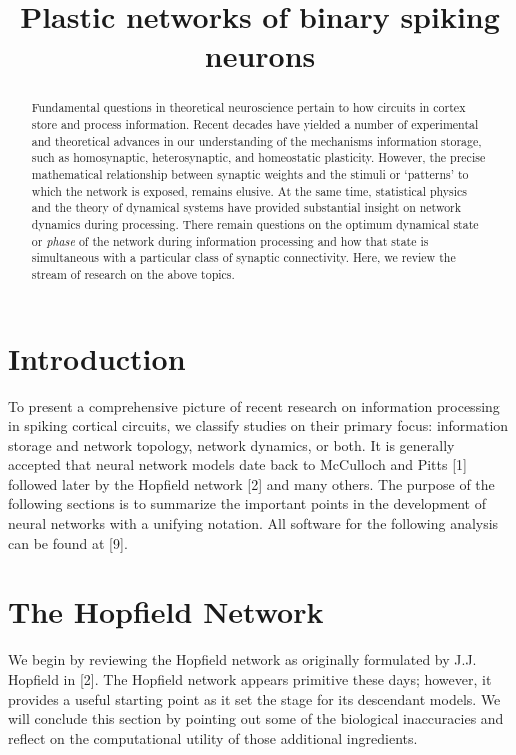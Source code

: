 \documentclass{article} %
\title{Plastic networks of binary spiking neurons}
\begin{document}
\maketitle

\begin{abstract}

Fundamental questions in theoretical neuroscience pertain to how circuits in cortex store and process information. Recent decades have yielded a number of experimental and theoretical advances in our understanding of the mechanisms information storage, such as homosynaptic, heterosynaptic, and homeostatic plasticity. However, the precise mathematical relationship between synaptic weights and the stimuli or `patterns' to which the network is exposed, remains elusive. At the same time, statistical physics and the theory of dynamical systems have provided substantial insight on network dynamics during processing. There remain questions on the optimum dynamical state or \emph{phase} of the network during information processing and how that state is simultaneous with a particular class of synaptic connectivity. Here, we review the stream of research on the above topics.


\end{abstract}


\section{Introduction}

To present a comprehensive picture of recent research on information processing in spiking cortical circuits, we classify studies on their primary focus: information storage and network topology, network dynamics, or both. It is generally accepted that neural network models date back to McCulloch and Pitts [1] followed later by the Hopfield network [2] and many others. The purpose of the following sections is to summarize the important points in the development of neural networks with a unifying notation. All software for the following analysis can be found at [9].  

\section{The Hopfield Network}

We begin by reviewing the Hopfield network as originally formulated by J.J. Hopfield in [2]. The Hopfield network appears primitive these days; however, it provides a useful starting point as it set the stage for its descendant models. We will conclude this section by pointing out some of the biological inaccuracies and reflect on the computational utility of those additional ingredients.
\end{document}
